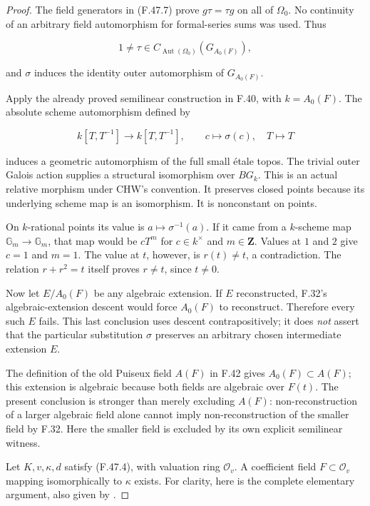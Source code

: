 \begin{proof}
The field generators in (F.47.7) prove \(g\tau=\tau g\) on all of \(\Omega_0\). No continuity of an arbitrary field automorphism for formal-series sums was used. Thus 

\[
  1\ne\tau\in
  C_{\operatorname{Aut}(\Omega_0)}(G_{A_0(F)}),
\]

and \(\sigma\) induces the identity outer automorphism of \(G_{A_0(F)}\).

Apply the already proved semilinear construction in F.40, with \(k=A_0(F)\). The absolute scheme automorphism defined by

\[
 k[T,T^{-1}]\longrightarrow k[T,T^{-1}],
                   \qquad c\mapsto\sigma(c),\quad T\mapsto T
\]

induces a geometric automorphism of the full small étale topos. The trivial outer Galois action supplies a structural isomorphism over \(BG_k\). This is an actual relative morphism under CHW's convention. It preserves closed points because its underlying scheme map is an isomorphism. It is nonconstant on points.

On \(k\)-rational points its value is \(a\mapsto\sigma^{-1}(a)\). If it came from a \(k\)-scheme map \(\mathbb G_m\to\mathbb G_m\), that map would be \(cT^m\) for \(c\in k^\times\) and \(m\in\mathbf Z\). Values at \(1\) and \(2\) give \(c=1\) and \(m=1\). The value at \(t\), however, is \(r(t)\ne t\), a contradiction. The relation \(r+r^2=t\) itself proves \(r\ne t\), since \(t\ne0\).

Now let \(E/A_0(F)\) be any algebraic extension. If \(E\) reconstructed, F.32's algebraic-extension descent would force \(A_0(F)\) to reconstruct. Therefore every such \(E\) fails. This last conclusion uses descent contrapositively; it does \emph{not} assert that the particular substitution \(\sigma\) preserves an arbitrary chosen intermediate extension \(E\).

The definition of the old Puiseux field \(A(F)\) in F.42 gives \(A_0(F)\subset A(F)\); this extension is algebraic because both fields are algebraic over \(F(t)\). The present conclusion is stronger than merely excluding \(A(F)\): non-reconstruction of a larger algebraic field alone cannot imply non-reconstruction of the smaller field by F.32. Here the smaller field is excluded by its own explicit semilinear witness.

Let \(K,v,\kappa,d\) satisfy (F.47.4), with valuation ring \(\mathcal O_v\). A coefficient field \(F\subset\mathcal O_v\) mapping isomorphically to \(\kappa\) exists. For clarity, here is the complete elementary argument, also given by \citet[Proposition~3.3.8 and Lemma~3.3.9, author-PDF pp.~117--118]{F_ADH2017}.


\end{proof}
